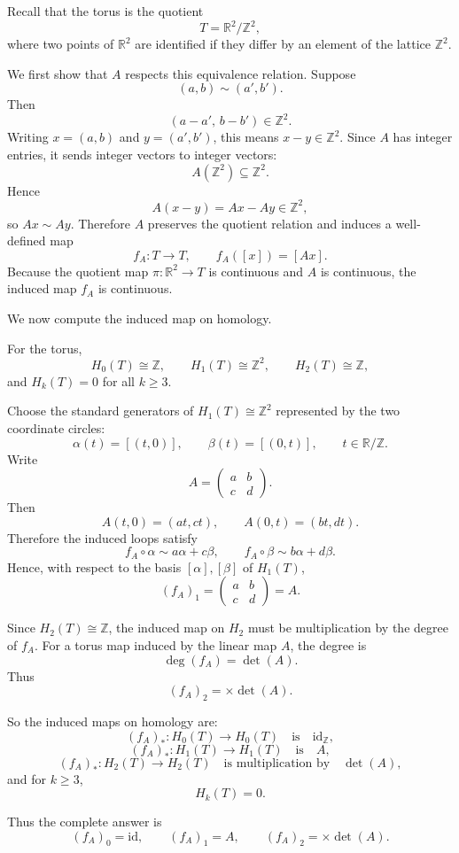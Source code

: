 \begin{solution}

Recall that the torus is the quotient
\[
T=\mathbb R^2/\mathbb Z^2,
\]
where two points of \(\mathbb R^2\) are identified if they differ by an element of the lattice \(\mathbb Z^2\).

We first show that \(A\) respects this equivalence relation. Suppose
\[
(a,b)\sim (a',b').
\]
Then
\[
(a-a',\,b-b')\in \mathbb Z^2.
\]
Writing \(x=(a,b)\) and \(y=(a',b')\), this means \(x-y\in \mathbb Z^2\). Since \(A\) has integer entries, it sends integer vectors to integer vectors:
\[
A(\mathbb Z^2)\subseteq \mathbb Z^2.
\]
Hence
\[
A(x-y)=Ax-Ay\in \mathbb Z^2,
\]
so \(Ax\sim Ay\). Therefore \(A\) preserves the quotient relation and induces a well-defined map
\[
f_A:T\to T,
\qquad
f_A([x])=[Ax].
\]
Because the quotient map \(\pi:\mathbb R^2\to T\) is continuous and \(A\) is continuous, the induced map \(f_A\) is continuous.

We now compute the induced map on homology.

For the torus,
\[
H_0(T)\cong \mathbb Z,\qquad
H_1(T)\cong \mathbb Z^2,\qquad
H_2(T)\cong \mathbb Z,
\]
and \(H_k(T)=0\) for all \(k\ge 3\).

Choose the standard generators of \(H_1(T)\cong \mathbb Z^2\) represented by the two coordinate circles:
\[
\alpha(t)=[(t,0)],
\qquad
\beta(t)=[(0,t)],
\qquad t\in \mathbb R/\mathbb Z.
\]
Write
\[
A=
\begin{pmatrix}
	a & b\\
	c & d
\end{pmatrix}.
\]
Then
\[
A(t,0)=(at,ct),
\qquad
A(0,t)=(bt,dt).
\]
Therefore the induced loops satisfy
\[
f_A\circ \alpha \sim a\alpha+c\beta,
\qquad
f_A\circ \beta \sim b\alpha+d\beta.
\]
Hence, with respect to the basis \([\alpha],[\beta]\) of \(H_1(T)\),
\[
(f_A)_1=
\begin{pmatrix}
	a & b\\
	c & d
\end{pmatrix}
=A.
\]

Since \(H_2(T)\cong \mathbb Z\), the induced map on \(H_2\) must be multiplication by the degree of \(f_A\). For a torus map induced by the linear map \(A\), the degree is
\[
\deg(f_A)=\det(A).
\]
Thus
\[
(f_A)_2=\times \det(A).
\]

So the induced maps on homology are:
\[
(f_A)_*:H_0(T)\to H_0(T)
\quad\text{is}\quad
\mathrm{id}_{\mathbb Z},
\]
\[
(f_A)_*:H_1(T)\to H_1(T)
\quad\text{is}\quad
A,
\]
\[
(f_A)_*:H_2(T)\to H_2(T)
\quad\text{is multiplication by}\quad
\det(A),
\]
and for \(k\ge 3\),
\[
H_k(T)=0.
\]

Thus the complete answer is
\[
(f_A)_0=\mathrm{id},\qquad
(f_A)_1=A,\qquad
(f_A)_2=\times \det(A).
\]
\end{solution}

